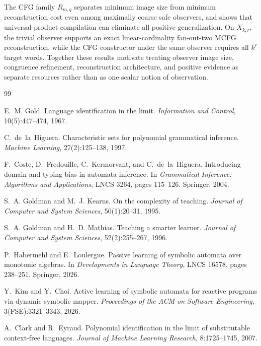 \documentclass[11pt]{article}
\theoremstyle{definition}
\theoremstyle{remark}
\begin{document}
The CFG family \(R_{m,q}\) separates minimum image size from minimum
reconstruction cost even among maximally coarse safe observers, and shows that
universal-product compilation can eliminate all positive generalization.  On
\(X_{k,r}\), the trivial observer supports an exact linear-cardinality
fan-out-two MCFG reconstruction, while the CFG constructor under the same
observer requires all \(k^r\) target words.  Together these results motivate
treating observer image size, congruence refinement, reconstruction
architecture, and positive evidence as separate resources rather than as one
scalar notion of observation.
\begin{thebibliography}{99}

E.~M. Gold.
\newblock Language identification in the limit.
\newblock \emph{Information and Control}, 10(5):447--474, 1967.

C.~de~la~Higuera.
\newblock Characteristic sets for polynomial grammatical inference.
\newblock \emph{Machine Learning}, 27(2):125--138, 1997.

F.~Coste, D.~Fredouille, C.~Kermorvant, and C.~de~la~Higuera.
\newblock Introducing domain and typing bias in automata inference.
\newblock In \emph{Grammatical Inference: Algorithms and Applications},
LNCS 3264, pages 115--126. Springer, 2004.

S.~A. Goldman and M.~J. Kearns.
\newblock On the complexity of teaching.
\newblock \emph{Journal of Computer and System Sciences}, 50(1):20--31, 1995.

S.~A. Goldman and H.~D. Mathias.
\newblock Teaching a smarter learner.
\newblock \emph{Journal of Computer and System Sciences}, 52(2):255--267, 1996.

P.~Habermehl and E.~Loulergue.
\newblock Passive learning of symbolic automata over monotonic algebras.
\newblock In \emph{Developments in Language Theory}, LNCS 16578,
pages 238--251. Springer, 2026.

Y.~Kim and Y.~Choi.
\newblock Active learning of symbolic automata for reactive programs via
dynamic symbolic mapper.
\newblock \emph{Proceedings of the ACM on Software Engineering},
3(FSE):3321--3343, 2026.

A.~Clark and R.~Eyraud.
\newblock Polynomial identification in the limit of substitutable context-free
languages.
\newblock \emph{Journal of Machine Learning Research}, 8:1725--1745, 2007.


\end{thebibliography}
\end{document}
